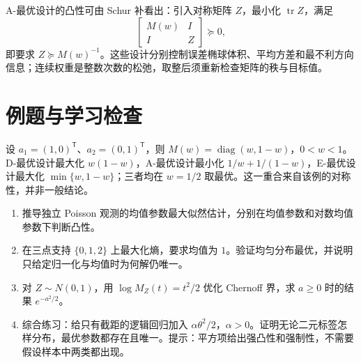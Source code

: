 A-最优设计的凸性可由 Schur 补看出：引入对称矩阵 $Z$，最小化 $\operatorname{tr}Z$，满足
\[
 \begin{bmatrix}M(w)&I\\I&Z\end{bmatrix}\succeq0,
\]
即要求 $Z\succeq M(w)^{-1}$。这些设计分别控制误差椭球体积、平均方差和最不利方向信息；连续权重是整数次数的松弛，取整后须重新检查矩阵的秩与目标值。

\section{例题与学习检查}
\begin{example}[两个正交测量方向]
设 $a_1=(1,0)^{\mathsf T}$、$a_2=(0,1)^{\mathsf T}$，则 $M(w)=\operatorname{diag}(w,1-w)$，$0<w<1$。D-最优设计最大化 $w(1-w)$，A-最优设计最小化 $1/w+1/(1-w)$，E-最优设计最大化 $\min\{w,1-w\}$；三者均在 $w=1/2$ 取最优。这一重合来自该例的对称性，并非一般结论。
\end{example}
\begin{enumerate}
 \item 推导独立 Poisson 观测的均值参数最大似然估计，分别在均值参数和对数均值参数下判断凸性。
 \item 在三点支持 $\{0,1,2\}$ 上最大化熵，要求均值为 $1$。验证均匀分布最优，并说明只给定归一化与均值时为何解仍唯一。
 \item 对 $Z\sim N(0,1)$，用 $\log M_Z(t)=t^2/2$ 优化 Chernoff 界，求 $a\geq0$ 时的结果 $e^{-a^2/2}$。
 \item 综合练习：给只有截距的逻辑回归加入 $\alpha\theta^2/2$，$\alpha>0$。证明无论二元标签怎样分布，最优参数都存在且唯一。提示：平方项给出强凸性和强制性，不需要假设样本中两类都出现。
\end{enumerate}

